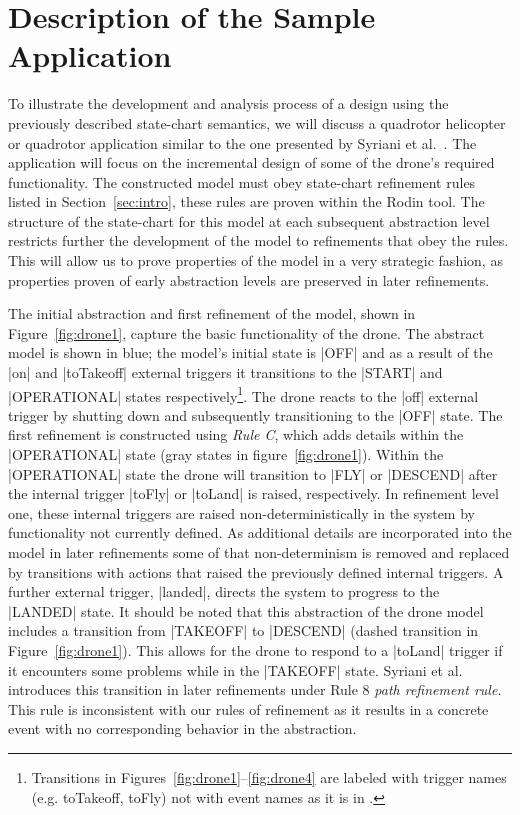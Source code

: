 \section{Description of the Sample Application}
\label{sec:descr-sample-appl}

To illustrate the development and analysis process of a design using the previously described 
state-chart semantics, we will discuss a quadrotor helicopter or quadrotor application similar to 
the one presented by Syriani et al.~\cite{Syriani_2019}. 
The application will focus on the incremental design of some of the drone's required functionality.
The constructed model must obey state-chart refinement rules listed in Section~\ref{sec:intro}, these rules are proven within the Rodin tool.
The structure of the state-chart for this model at each subsequent abstraction level restricts further the development of the model to refinements that obey the rules. 
This will allow us to prove properties of the model in a very strategic fashion, as properties proven of early abstraction levels are preserved in later refinements.

The initial abstraction and first refinement of the model, shown in Figure~\ref{fig:drone1}, capture the basic functionality of the drone. 
The abstract model is shown in blue; the model's initial state is |OFF| and as a result of the |on| and  |toTakeoff| external triggers it transitions to the |START| and |OPERATIONAL| states respectively\footnote{Transitions in Figures~\ref{fig:drone1}--\ref{fig:drone4} are labeled with trigger names
(e.g. toTakeoff, toFly) not with event names as it is in \UMLB.}. 
The drone reacts to the |off| external trigger by shutting down and subsequently transitioning to the |OFF| state.
The first refinement is constructed using \emph{Rule C}, which adds details within the |OPERATIONAL| state (gray states in figure~\ref{fig:drone1}).
Within the |OPERATIONAL| state the drone will transition to |FLY| or |DESCEND| after the internal trigger |toFly| or |toLand| is raised, respectively. 
In refinement level one, these internal triggers are raised non-deterministically in the system by functionality not currently defined.
As additional details are incorporated into the model in later refinements some of that non-determinism is 
removed and replaced by transitions with actions that raised the previously defined internal triggers.
A further external trigger, |landed|, directs the system to progress to the |LANDED| state.
It should be noted that this abstraction of the drone model includes a transition from |TAKEOFF| to |DESCEND| (dashed transition in Figure~\ref{fig:drone1}). 
This allows for the drone to respond to a |toLand| trigger if it encounters some problems while in the |TAKEOFF| state.
Syriani et al.~\cite{Syriani_2019} introduces this transition in later refinements under Rule 8 \emph{path refinement rule}. 
This rule is inconsistent with our rules of refinement as it results in a concrete event with no corresponding behavior in the abstraction.

